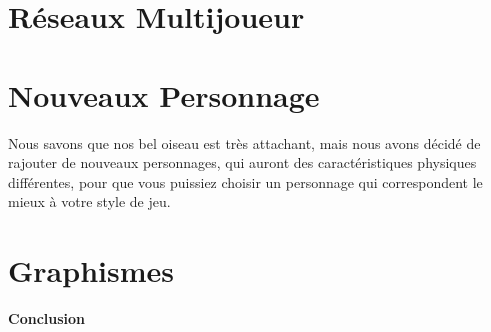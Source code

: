\documentclass [11pt]{report}
\begin{document}
	
	\section{Réseaux Multijoueur}



	\section{Nouveaux Personnage}
	Nous savons que nos bel oiseau est très attachant, mais nous avons décidé de rajouter de nouveaux personnages, qui auront des caractéristiques physiques différentes, pour que vous puissiez choisir un personnage qui correspondent le mieux à votre style de jeu.
	
	
	\section{Graphismes}
\newpage
\textbf{{\huge Conclusion}}
\end{document}
